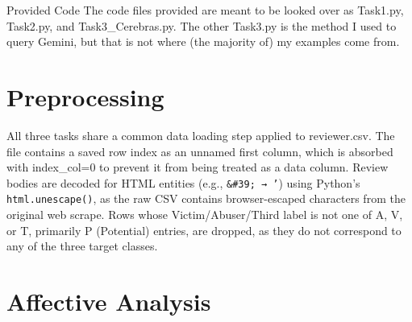 \documentclass[12pt]{article}
\begin{document}
\maketitlepage

\begin{important}{Provided Code}
    The code files provided are meant to be looked over as Task1.py, Task2.py, and 
    Task3\_Cerebras.py. The other Task3.py is the method I used to query Gemini, but 
    that is not where (the majority of) my examples come from.
\end{important}

\tableofcontents

\section{Preprocessing}

All three tasks share a common data loading step applied to reviewer.csv. The file contains 
a saved row index as an unnamed first column, which is absorbed with index\_col=0 to prevent 
it from being treated as a data column. Review bodies are decoded for HTML entities 
(e.g., \texttt{\&\#39; → '}) using Python's \texttt{html.unescape()}, as the raw CSV contains browser-escaped 
characters from the original web scrape. Rows whose Victim/Abuser/Third label is not one of 
A, V, or T, primarily P (Potential) entries, are dropped, as they do not correspond to 
any of the three target classes.

\section{Affective Analysis}
\end{document}
